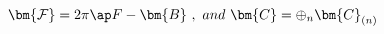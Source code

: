 \begin{equation}
\bm{\mathcal{F}}=2\pi\ap F-\bm{B}\ ,\ \mathnormal{and}\ 
\bm{C}=\oplus_n \bm{C}_{(n)}
\label{somedefs}\end{equation}

